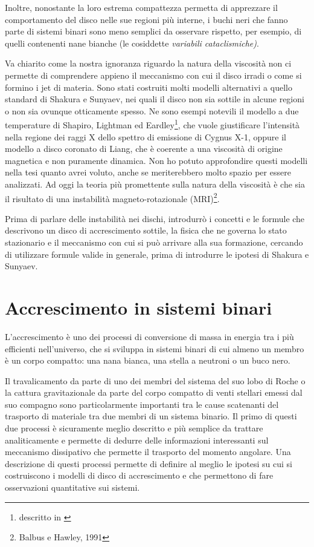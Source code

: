 \documentclass[a4paperbi]{article}
\begin{document}
	Inoltre, nonostante la loro estrema compattezza permetta di apprezzare il comportamento del disco nelle sue regioni più interne, i buchi neri che fanno parte di sistemi binari sono meno semplici da osservare rispetto, per esempio, di quelli contenenti nane bianche (le cosiddette \textit{variabili cataclismiche)}.

	Va chiarito come la nostra ignoranza riguardo la natura della viscosità non ci permette di comprendere appieno il meccanismo con cui il disco irradi o come si formino i jet di materia. Sono stati costruiti molti modelli alternativi a quello standard di Shakura e Sunyaev, nei quali il disco non sia sottile in alcune regioni o non sia ovunque otticamente spesso. Ne sono esempi notevili il modello a due temperature di Shapiro, Lightman ed Eardley\footnote{descritto in \cite{ShapiroLightmanEardley1976}}, che vuole giustificare l'intensità nella regione dei raggi X dello spettro di emissione di Cygnus X-1, oppure il modello a disco coronato di Liang, che è coerente a una viscosità di origine magnetica e non puramente dinamica. Non ho potuto approfondire questi modelli nella tesi quanto avrei voluto, anche se meriterebbero molto spazio per essere analizzati. Ad oggi la teoria più promettente sulla natura della viscosità è che sia il risultato di una instabilità magneto-rotazionale (MRI)\footnote{Balbus e Hawley, 1991}.

	Prima di parlare delle instabilità nei dischi, introdurrò i concetti e le formule che descrivono un disco di accrescimento sottile, la fisica che ne governa lo stato stazionario e il meccanismo con cui si può arrivare alla sua formazione, cercando di utilizzare formule valide in generale, prima di introdurre le ipotesi di Shakura e Sunyaev.
	
\newpage
\section{Accrescimento in sistemi binari}
	L'accrescimento è uno dei processi di conversione di massa in energia tra i più efficienti nell'universo, che si sviluppa in sistemi binari di cui almeno un membro è un corpo compatto: una nana bianca, una stella a neutroni o un buco nero.

	Il travalicamento da parte di uno dei membri del sistema del suo lobo di Roche o la cattura gravitazionale da parte del corpo compatto di venti stellari emessi dal suo compagno sono particolarmente importanti tra le cause scatenanti del trasporto di materiale tra due membri di un sistema binario. Il primo di questi due processi è sicuramente meglio descritto e più semplice da trattare analiticamente e permette di dedurre delle informazioni interessanti sul meccanismo dissipativo che permette il trasporto del momento angolare. Una descrizione di questi processi permette di definire al meglio le ipotesi su cui si costruiscono i modelli di disco di accrescimento e che permettono di fare osservazioni quantitative sui sistemi.
	
\end{document}
